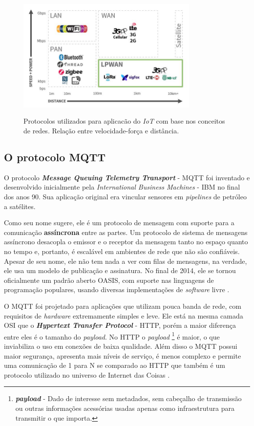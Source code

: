 \begin{figure}[H]
	\centering
	\caption{Protocolos utilizados para aplicacão do \textit{IoT} com base nos conceitos de redes. Relação entre velocidade-força e distância.}
	\includegraphics[width=0.8\textwidth]{figuras/iotprotocols.jpg}
	\label{fig:iot_protocols}
\end{figure}


\subsection{O protocolo MQTT}

O protocolo \textbf{\textit{Message Queuing Telemetry Transport}} - MQTT foi inventado e desenvolvido inicialmente pela \textit{International Business Machines} - IBM no final dos anos 90. Sua aplicação original era vincular sensores em \textit{pipelines} de petróleo a satélites. 

Como seu nome sugere, ele é um protocolo de mensagem com suporte para a comunicação \textbf{assíncrona} entre as partes. Um protocolo de sistema de mensagens assíncrono desacopla o emissor e o receptor da mensagem tanto no espaço quanto no tempo e, portanto, é escalável em ambientes de rede que não são confiáveis. Apesar de seu nome, ele não tem nada a ver com filas de mensagens, na verdade, ele usa um modelo de publicação e assinatura. No final de 2014, ele se tornou oficialmente um padrão aberto OASIS, com suporte nas linguagens de programação populares, usando diversas implementações de \textit{software} livre \cite{IBM}.

O MQTT foi projetado para aplicações que utilizam pouca banda de rede, com requisitos de \textit{hardware} extremamente simples e leve. Ele está na mesma camada OSI que o \textbf{\textit{Hypertext Transfer Protocol}} - HTTP, porém a maior diferença entre eles é o tamanho do \textit{payload}. No HTTP o \textit{payload} \footnote{\textit{\textbf{payload}} - Dado de interesse sem metadados, sem cabeçalho de transmissão ou outras informações acessórias usadas apenas como infraestrutura para transmitir o que importa.} é maior, o que inviabiliza o uso em conexões de baixa qualidade. Além disso o MQTT possui maior segurança, apresenta mais níveis de serviço, é menos complexo e permite uma comunicação de 1 para N se comparado ao HTTP que também é um protocolo utilizado no universo de Internet das Coisas \cite{UFRJ}.

